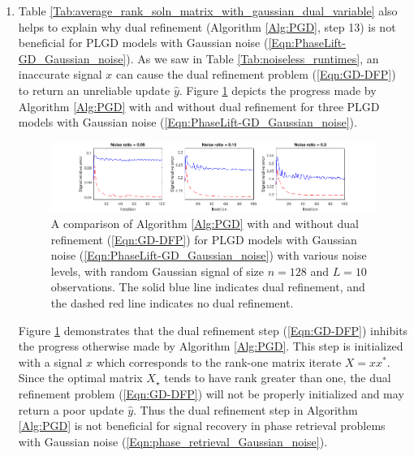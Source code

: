 \begin{enumerate}
\item

Table \ref{Tab:average_rank_soln_matrix_with_gaussian_dual_variable} also helps to explain why dual refinement (Algorithm \ref{Alg:PGD}, step 13) is not beneficial for PLGD models with Gaussian noise (\ref{Eqn:PhaseLift-GD_Gaussian_noise}).  As we saw in Table \ref{Tab:noiseless_runtimes}, an inaccurate signal $x$ can cause the dual refinement problem (\ref{Eqn:GD-DFP}) to return an unreliable update $\hat{y}$.  Figure \ref{Fig:noisy_random_DFP_vs_no_DFP} depicts the progress made by Algorithm \ref{Alg:PGD} with and without dual refinement for three PLGD models with Gaussian noise (\ref{Eqn:PhaseLift-GD_Gaussian_noise}).

\begin{figure}[H]
\hspace{-1.6cm}  \includegraphics[scale=0.6]{noisy_random_signal_DFP_vs_no_DFP}
\caption{A comparison of Algorithm \ref{Alg:PGD} with and without dual refinement (\ref{Eqn:GD-DFP}) for PLGD models with Gaussian noise (\ref{Eqn:PhaseLift-GD_Gaussian_noise}) with various noise levels, with random Gaussian signal of size $n = 128$ and $L = 10$ observations.  The solid blue line indicates dual refinement, and the dashed red line indicates no dual refinement.}
\label{Fig:noisy_random_DFP_vs_no_DFP}
\end{figure}



Figure \ref{Fig:noisy_random_DFP_vs_no_DFP} demonstrates that the dual refinement step (\ref{Eqn:GD-DFP})  inhibits the progress otherwise made by Algorithm \ref{Alg:PGD}.  This step is initialized with a signal $x$ which corresponds to the rank-one matrix iterate $X = xx^*$.  Since the optimal matrix $X_\star$ tends to have rank greater than one, the dual refinement problem (\ref{Eqn:GD-DFP}) will not be properly initialized and may return a poor update $\hat{y}$.  Thus the dual refinement step in Algorithm \ref{Alg:PGD} is not beneficial for signal recovery in phase retrieval problems with Gaussian noise (\ref{Eqn:phase_retrieval_Gaussian_noise}).




\end{enumerate}




